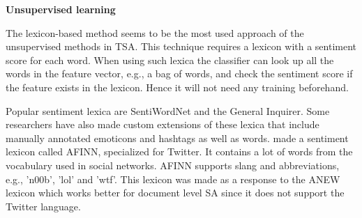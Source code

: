 \noindent
\textbf{Unsupervised learning} \\
\noindent 

The lexicon-based method seems to be the most used approach of the unsupervised methods in TSA. This technique requires a lexicon with a sentiment score for each word. When using such lexica the classifier can look up all the words in the feature vector, e.g., a bag of words, and check the sentiment score if the feature exists in the lexicon. Hence it will not need any training beforehand.
	
Popular sentiment lexica are SentiWordNet and the General Inquirer. Some researchers have also made custom extensions of these lexica that include manually annotated emoticons and hashtags as well as words. \cite{article:afinn} made a sentiment lexicon called AFINN, specialized for Twitter. It contains a lot of words from the vocabulary used in social networks. AFINN supports slang and abbreviations, e.g., 'n00b', 'lol' and 'wtf'. This lexicon was made as a response to the ANEW lexicon which works better for document level SA since it does not support the Twitter language.